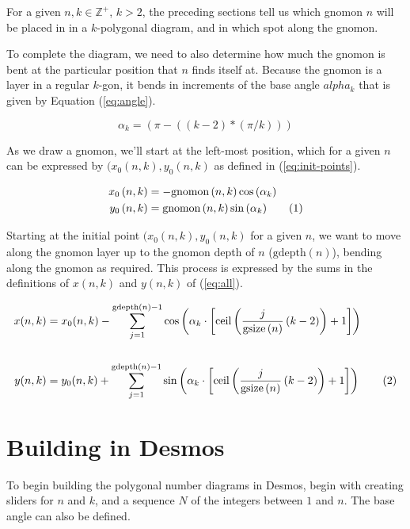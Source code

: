 \documentclass[notitlepage]{report}
\newcommand\numberthis{\addtocounter{equation}{1}\tag{\theequation}}
\begin{document}
For a given $n,k \in \mathbb{Z}^{+}$, $k > 2$, the preceding sections tell us which gnomon $n$ will be placed in in a $k$-polygonal diagram, and in which spot along the gnomon. 

To complete the diagram, we need to also determine how much the gnomon is bent at the particular position that $n$ finds itself at. Because the gnomon is a layer in a regular $k$-gon, it bends in increments of the base angle $alpha_k$ that is given by Equation (\ref{eq:angle}).


\begin{equation}
    \alpha_k=\left(\pi-((k-2)*(\pi/k))\right)
\label{eq:angle}
\end{equation}

As we draw a gnomon, we'll start at the left-most position, which for a given $n$ can be expressed by $(x_0(n,k),y_0(n,k)$ as defined in (\ref{eq:init-points}).

\begin{align*}
    x_0\left(n,k\right) &= -\text{gnomon}\left(n,k\right)\cos{(\alpha_k)} \\
    y_0\left(n,k\right) &=
    \text{gnomon}\left(n,k\right)\sin{(\alpha_k)} 
    \numberthis
    \label{eq:init-points}
\end{align*}

Starting at the initial point $(x_0(n,k),y_0(n,k)$ for a given $n$, we want to move along the gnomon layer up to the gnomon depth of $n$ ($\text{gdepth}(n)$), bending along the gnomon as required. This process is expressed by the sums in the definitions of $x(n,k)$ and $y(n,k)$ of (\ref{eq:all}).

\begin{align*}
x(n,k) &= x_0(n,k) - \sum_{j=1}^{\text{gdepth}\left(n\right)-1}\cos\left(\alpha_{k}\cdot\left[\operatorname{ceil}\left(\frac{j}{\text{gsize}\left(n\right)}\left(k-2\right)\right)+1\right]\right)\\
\\
y(n,k) &= y_0(n,k) + \sum_{j=1}^{\text{gdepth}\left(n\right)-1}\sin\left(\alpha_k\cdot\left[\operatorname{ceil}\left(\frac{j}{\text{gsize}\left(n\right)}\left(k-2\right)\right)+1\right]\right)
\numberthis
\label{eq:all}
\end{align*}

\section*{Building in Desmos}

To begin building the polygonal number diagrams in Desmos, begin with creating sliders for $n$ and $k$, and a sequence $N$ of the integers between $1$ and $n$. The base angle can also be defined.
\end{document}
